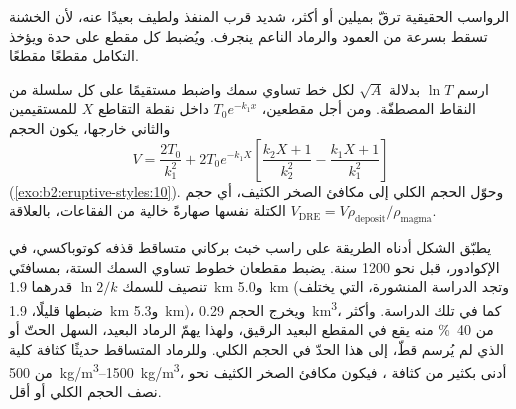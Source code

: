 الرواسب الحقيقية ترقّ بميلين أو أكثر، شديد قرب المنفذ ولطيف
بعيدًا عنه، لأن  الخشنة تسقط بسرعة من العمود والرماد الناعم
ينجرف. ويُضبط كل مقطع على حدة ويؤخذ التكامل مقطعًا
مقطعًا.

\begin{method}\label{met:b2:eruptive-styles:volume}
ارسم $\ln T$ بدلالة $\sqrt A$ لكل خط تساوي سمك واضبط مستقيمًا على كل
سلسلة من النقاط المصطفّة. ومن أجل مقطعين، $T_0e^{-k_1x}$ داخل نقطة التقاطع
$X$ للمستقيمين والثاني خارجها، يكون الحجم
\[
V = \frac{2T_0}{k_1^2} + 2T_0e^{-k_1X}\left[\frac{k_2X + 1}{k_2^2} -
\frac{k_1X + 1}{k_1^2}\right]
\]
(\cref{exo:b2:eruptive-styles:10}). وحوّل الحجم الكلي إلى مكافئ الصخر الكثيف، أي حجم
الكتلة نفسها صهارةً خالية من الفقاعات، بالعلاقة $V_{\mathrm{DRE}} = V\rho_{\mathrm{deposit}}/\rho_{\mathrm{magma}}$.
\end{method}

يطبّق الشكل أدناه الطريقة على راسب خبث بركاني متساقط قذفه كوتوباكسي، في
الإكوادور، قبل نحو \num{1200} سنة. يضبط مقطعان خطوط تساوي السمك الستة،
بمسافتَي تنصيف للسمك $\ln 2/k$ قدرهما \qty{1.9}{km} و\qty{5.0}{km} (وتجد
الدراسة المنشورة، التي يختلف ضبطها قليلًا، \qty{1.9}{km}
و\qty{5.3}{km})، ويخرج الحجم \qty{0.29}{km^3}، كما في تلك الدراسة. وأكثر من
\qty{40}{\percent} منه يقع في المقطع البعيد الرقيق، ولهذا يهمّ الرماد البعيد،
السهل الحتّ أو الذي لم يُرسم قطّ، إلى هذا الحدّ في الحجم الكلي. وللرماد المتساقط حديثًا
كثافة كلية من \qtyrange{500}{1500}{kg/m^3}، أدنى بكثير من كثافة
، فيكون مكافئ الصخر الكثيف نحو نصف الحجم الكلي أو أقل.

